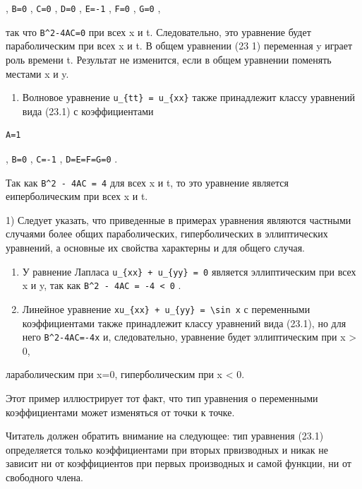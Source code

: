 \documentclass[
  ukrainian,
]{article}
\providecommand{\tightlist}{%
  \setlength{\itemsep}{0pt}\setlength{\parskip}{0pt}}
\begin{document}
, \texttt{B=0} , \texttt{C=0} , \texttt{D=0} , \texttt{E=-1} ,
\texttt{F=0} , \texttt{G=0} ,

так что \texttt{B\^{}2-4AC=0} при всех x и t. Следовательно, это
уравнение будет параболическим при всех x и t. В общем уравнении (23 1)
переменная y играет роль времени t. Результат не изменится, если в общем
уравнении поменять местами x и y.

\begin{enumerate}
\def\labelenumi{\arabic{enumi}.}
\setcounter{enumi}{1}
\tightlist
\item
  Волновое уравнение \texttt{u\_\{tt\}\ =\ u\_\{xx\}} также принадлежит
  классу уравнений вида (23.1) с коэффициентами
\end{enumerate}

\begin{verbatim}
A=1
\end{verbatim}

, \texttt{B=0} , \texttt{C=-1} , \texttt{D=E=F=G=0} .

Так как \texttt{B\^{}2\ -\ 4AC\ =\ 4} для всех x и t, то это уравнение
является еиперболическим при всех x и t.

1) Следует указать, что приведенные в примерах уравнения являются
частными случаями более общих параболических, гиперболических в
эллиптических уравнений, а основные их свойства характерны и для общего
случая.

\begin{enumerate}
\def\labelenumi{\arabic{enumi}.}
\setcounter{enumi}{2}
\item
  У равнение Лапласа \texttt{u\_\{xx\}\ +\ u\_\{yy\}\ =\ 0} является
  эллиптическим при всех x и y, так как
  \texttt{B\^{}2\ -\ 4AC\ =\ -4\ \textless{}\ 0} .
\item
  Линейное уравнение
  \texttt{xu\_\{xx\}\ +\ u\_\{yy\}\ =\ \textbackslash{}sin\ x} с
  переменными коэффициентами также принадлежит классу уравнений вида
  (23.1), но для него \texttt{B\^{}2-4AC=-4x} и, следовательно,
  уравнение будет эллиптическим при x \textgreater{} 0,
\end{enumerate}

лараболическим при x=0, гиперболическим при x \textless{} 0.

Этот пример иллюстрирует тот факт, что тип уравнения о переменными
коэффициентами может изменяться от точки к точке.

Читатель должен обратить внимание на следующее: тип уравнения (23.1)
определяется только коэффициентами при вторых првизводных и никак не
зависит ни от коэффициентов при первых производных и самой функции, ни
от свободного члена.
\end{document}
